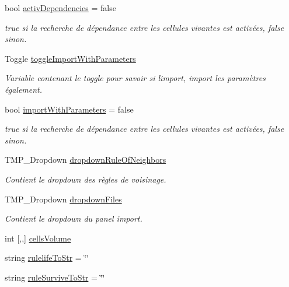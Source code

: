 \begin{DoxyCompactItemize}
bool \mbox{\hyperlink{class_parameters_a69b261ceea3746beb517d7082a8fc810}{activ\+Dependencies}} = false
\begin{DoxyCompactList}\small\item\em true si la recherche de dépendance entre les cellules vivantes est activées, false sinon. \end{DoxyCompactList}\item 
Toggle \mbox{\hyperlink{class_parameters_a1de1921a55ef745c4ab25ac46a98c1d8}{toggle\+Import\+With\+Parameters}}
\begin{DoxyCompactList}\small\item\em Variable contenant le toggle pour savoir si l\textquotesingle{}import, import les paramètres également. \end{DoxyCompactList}\item 
bool \mbox{\hyperlink{class_parameters_a2b7e1fe1403da019b5762792e4ea302b}{import\+With\+Parameters}} = false
\begin{DoxyCompactList}\small\item\em true si la recherche de dépendance entre les cellules vivantes est activées, false sinon. \end{DoxyCompactList}\item 
T\+M\+P\+\_\+\+Dropdown \mbox{\hyperlink{class_parameters_a9bb907abb659026dbf7b4f64343aefa1}{dropdown\+Rule\+Of\+Neighbors}}
\begin{DoxyCompactList}\small\item\em Contient le dropdown des règles de voisinage. \end{DoxyCompactList}\item 
T\+M\+P\+\_\+\+Dropdown \mbox{\hyperlink{class_parameters_ae4cea23bda0b2bc3955516a37e9d9993}{dropdown\+Files}}
\begin{DoxyCompactList}\small\item\em Contient le dropdown du panel import. \end{DoxyCompactList}\item 
int \mbox{[},,\mbox{]} \mbox{\hyperlink{class_parameters_a0d8550932a58f49a60370eec0c4700d1}{cells\+Volume}}
\item 
string \mbox{\hyperlink{class_parameters_a83b35077082784a379d79db7e1b96e06}{rulelife\+To\+Str}} = \char`\"{}\char`\"{}
\item 
string \mbox{\hyperlink{class_parameters_a89dcaef13a4d9b7a41631b16c2e901a7}{rule\+Survive\+To\+Str}} = \char`\"{}\char`\"{}
\end{DoxyCompactItemize}



